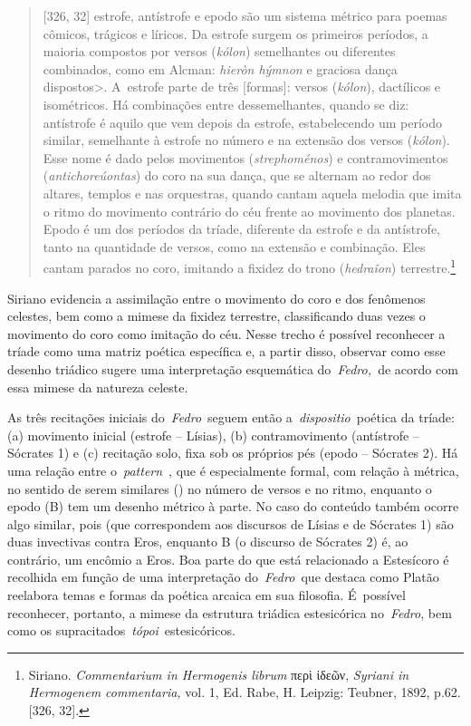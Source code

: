 \begin{quote}
[326, 32] estrofe, antístrofe e epodo são um sistema métrico para
poemas cômicos, trágicos e líricos. Da estrofe surgem os primeiros
períodos, a maioria compostos por versos (\emph{kólon}) semelhantes ou
diferentes combinados, como em Alcman: \emph{hieròn hýmnon} e graciosa dança
dispostos\textgreater{}. A~estrofe parte de três [formas]: versos
(\emph{kólon}), dactílicos e isométricos. Há combinações entre
dessemelhantes, quando se diz: antístrofe é aquilo que vem depois da
estrofe, estabelecendo um período similar, semelhante à estrofe no
número e na extensão dos versos (\emph{kólon}). Esse nome é dado pelos
movimentos (\emph{strephoménos}) e contramovimentos
(\emph{antichoreúontas}) do coro na sua dança, que se alternam ao redor
dos altares, templos e nas orquestras, quando cantam aquela melodia que
imita o ritmo do movimento contrário do céu frente ao movimento dos
planetas. Epodo é um dos períodos da tríade, diferente da estrofe e da
antístrofe, tanto na quantidade de versos, como na extensão e
combinação. Eles cantam parados no coro, imitando a fixidez do trono
(\emph{hedraîon}) terrestre.\footnote{Siriano.
  \emph{Commentarium in Hermogenis librum} περὶ ἰδεῶν, \emph{Syriani in
  Hermogenem commentaria,} vol. 1, Ed. Rabe, H. Leipzig: Teubner, 1892,
  p.62. {[}326, 32{]}.}
\end{quote}

 

Siriano evidencia a assimilação entre o movimento do coro e dos
fenômenos celestes, bem como a mimese da fixidez terrestre,
classificando duas vezes o movimento do coro como imitação do céu. Nesse
trecho é possível reconhecer a tríade como uma matriz poética específica
e, a partir disso, observar como esse desenho triádico sugere uma
interpretação esquemática do~\emph{Fedro,~}de acordo com essa mimese da
natureza celeste.

As três recitações iniciais do~\emph{Fedro}~seguem então
a~\emph{dispositio}~poética da tríade: (a) movimento inicial (estrofe --
Lísias), (b) contramovimento (antístrofe -- Sócrates 1) e (c) recitação
solo, fixa sob os próprios pés (epodo -- Sócrates 2). Há uma relação
entre o~\emph{pattern}~, que é especialmente formal, com relação à
métrica, no sentido de serem similares () no número de versos e no
ritmo, enquanto o epodo (B) tem um desenho métrico à parte. No caso do
conteúdo também ocorre algo similar, pois  (que correspondem aos
discursos de Lísias e de Sócrates 1) são duas invectivas contra Eros,
enquanto B (o discurso de Sócrates 2) é, ao contrário, um encômio a
Eros. Boa parte do que está relacionado a Estesícoro é recolhida em
função de uma interpretação do~\emph{Fedro~}que destaca como Platão
reelabora temas e formas da poética arcaica em sua filosofia. É~possível
reconhecer, portanto, a mimese da estrutura triádica estesicórica
no~\emph{Fedro}, bem como os supracitados~\emph{tópoi}~estesicóricos.


